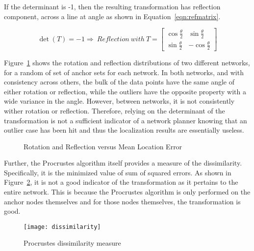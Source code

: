 If the determinant is -1, then the resulting transformation has reflection component, across a line at angle as shown in Equation~\ref{eqn:refmatrix}. 

\begin{equation}
	\det{(T)}=-1 \Rightarrow ~Reflection ~with ~T=
	\begin{bmatrix}
	\cos{\frac{\theta}{2}} & \sin{\frac{\theta}{2}} \\ 
	\sin{\frac{\theta}{2}} & -\cos{\frac{\theta}{2}}\end{bmatrix}
	\label{eqn:refmatrix} 
\end{equation}

Figure~\ref{fig:rotref} shows the rotation and reflection distributions of two different networks, for a random of set of anchor sets for each network.  In both networks, and with consistency across others, the bulk of the data points have the same angle of either rotation or reflection, while the outliers have the opposite property with a wide variance in the angle.  However, between networks, it is not consistently wither rotation or reflection.  Therefore, relying on the determinant of the transformation is not a sufficient indicator of a network planner knowing that an outlier case has been hit and thus the localization results are essentially useless.

\begin{figure}
  \centering
	\caption{Rotation and Reflection versus Mean Location Error}	
	\label{fig:rotref}
\end{figure}

Further, the Procrustes algorithm itself provides a measure of the dissimilarity.  Specifically, it is the minimized value of sum of squared errors\cite{procrustes-matlab}.  As shown in Figure~\ref{fig:dissimilarity}, it is not a good indicator of the transformation as it pertains to the entire network.  This is because the Procrustes algorithm is only performed on the anchor nodes themselves and for those nodes themselves, the transformation is good.

\begin{figure}
  \centering
	\texttt{[image: dissimilarity]}
	\caption{Procrustes dissimilarity measure}	
	\label{fig:dissimilarity}
\end{figure}

